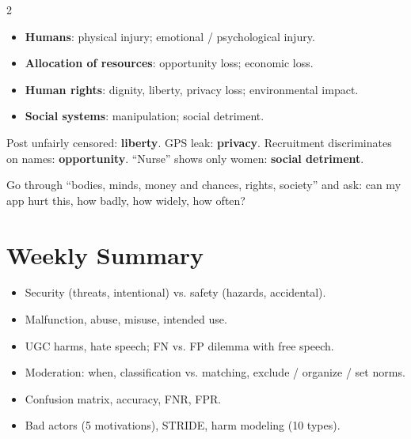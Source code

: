 \documentclass[a4paper,9pt]{extarticle}
\begin{document}
\begin{multicols}{2}
\begin{definition}
\begin{itemize}
\item \textbf{Humans}: physical injury; emotional / psychological injury.

\item \textbf{Allocation of resources}: opportunity loss; economic loss.

\item \textbf{Human rights}: dignity, liberty, privacy loss; environmental impact.

\item \textbf{Social systems}: manipulation; social detriment.

\end{itemize}

\end{definition}


\begin{example}

Post unfairly censored: \textbf{liberty}. GPS leak: \textbf{privacy}. Recruitment
discriminates on names: \textbf{opportunity}. ``Nurse'' shows only women: \textbf{social
detriment}.

\end{example}


\begin{goat}

Go through ``bodies, minds, money and chances, rights, society'' and ask: can my app hurt this,
how badly, how widely, how often?

\end{goat}



\section{Weekly Summary}


\begin{summary}

\begin{itemize}

\item Security (threats, intentional) vs. safety (hazards, accidental).

\item Malfunction, abuse, misuse, intended use.

\item UGC harms, hate speech; FN vs. FP dilemma with free speech.

\item Moderation: when, classification vs. matching, exclude / organize / set norms.

\item Confusion matrix, accuracy, FNR, FPR.

\item Bad actors (5 motivations), STRIDE, harm modeling (10 types).

\end{itemize}

\end{summary}


\end{multicols}
\end{document}
